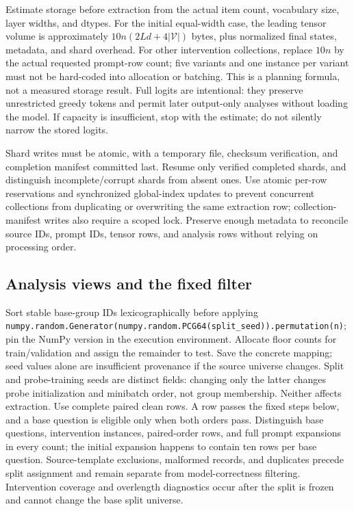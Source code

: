 \documentclass[11pt]{article}
\begin{document}
Estimate storage before extraction from the actual item count, vocabulary size, layer widths, and dtypes.
For the initial equal-width case, the leading tensor volume is approximately $10n(2Ld+4|\mathcal V|)$ bytes, plus normalized final states, metadata, and shard overhead.
For other intervention collections, replace $10n$ by the actual requested prompt-row count; five variants and one instance per variant must not be hard-coded into allocation or batching.
This is a planning formula, not a measured storage result.
Full logits are intentional: they preserve unrestricted greedy tokens and permit later output-only analyses without loading the model.
If capacity is insufficient, stop with the estimate; do not silently narrow the stored logits.

Shard writes must be atomic, with a temporary file, checksum verification, and completion manifest committed last.
Resume only verified completed shards, and distinguish incomplete/corrupt shards from absent ones.
Use atomic per-row reservations and synchronized global-index updates to prevent concurrent collections from duplicating or overwriting the same extraction row; collection-manifest writes also require a scoped lock.
Preserve enough metadata to reconcile source IDs, prompt IDs, tensor rows, and analysis rows without relying on processing order.

\subsection{Analysis views and the fixed filter}

Sort stable base-group IDs lexicographically before applying \texttt{numpy.random.Generator(numpy.random.PCG64(split\_seed)).permutation(n)}; pin the NumPy version in the execution environment.
Allocate floor counts for train/validation and assign the remainder to test.
Save the concrete mapping; seed values alone are insufficient provenance if the source universe changes.
Split and probe-training seeds are distinct fields: changing only the latter changes probe initialization and minibatch order, not group membership.
Neither affects extraction.
Use complete paired clean rows. A row passes the fixed steps below, and a base question is eligible only when both orders pass.
Distinguish base questions, intervention instances, paired-order rows, and full prompt expansions in every count; the initial expansion happens to contain ten rows per base question.
Source-template exclusions, malformed records, and duplicates precede split assignment and remain separate from model-correctness filtering.
Intervention coverage and overlength diagnostics occur after the split is frozen and cannot change the base split universe.
\end{document}
